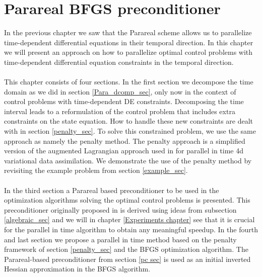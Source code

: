\chapter{Parareal BFGS preconditioner} \label{method_chap}
In the previous chapter we saw that the Parareal scheme allows us to parallelize time-dependent differential equations in their temporal direction. In this chapter we will present an approach on how to parallelize optimal control problems with time-dependent differential equation constraints in the temporal direction. 
\\
\\
This chapter consists of four sections. In the first section we decompose the time domain as we did in section \ref{Para_dcomp_sec}, only now in the context of control problems with time-dependent DE constraints. Decomposing the time interval leads to a reformulation of the control problem that includes extra constraints on the state equation. How to handle these new constraints are dealt with in section \ref{penalty_sec}. To solve this constrained problem, we use the same approach as \cite{maday2002parareal} namely the penalty method. The penalty approach is a simplified version of the augmented Lagrangian approach used in \cite{rao2016time} for parallel in time 4d variational data assimilation. We demonstrate the use of the penalty method by revisiting the example problem from section \ref{example_sec}.
\\
\\
In the third section a Parareal based preconditioner to be used in the optimization algorithms solving the optimal control problems is presented. This preconditioner originally proposed in \cite{maday2002parareal} is derived using ideas from subsection \ref{algebraic_sec} and we will in chapter \ref{Experiments chapter} see that it is crucial for the parallel in time algorithm to obtain any meaningful speedup. In the fourth and last section we propose a parallel in time method based on the penalty framework of section \ref{penalty_sec} and the BFGS optimization algorithm. The Parareal-based preconditioner from section \ref{pc sec} is used as an initial inverted Hessian approximation in the BFGS algorithm.
